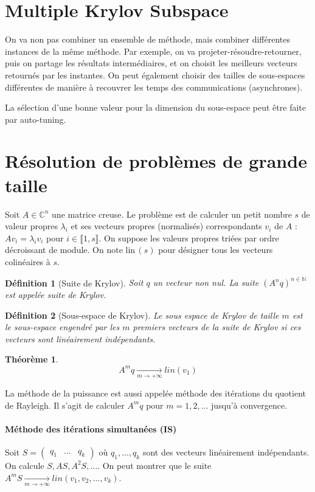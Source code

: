 \documentclass{article}
\newtheorem{thm}{Théorème}
\newtheorem{defi}{Définition}
\newcommand{\lin}{\text{lin}\,}
\begin{document}
\section{Multiple Krylov Subspace}
On va non pas combiner un ensemble de méthode, mais combiner différentes instances de la même méthode. Par exemple, on va projeter-résoudre-retourner, puis on partage les résultats intermédiaires, et on choisit les meilleurs vecteurs retournés par les instantes. On peut également choisir des tailles de sous-espaces différentes de manière à recouvrer les temps des communications (asynchrones).

La sélection d'une bonne valeur pour la dimension du sous-espace peut être faite par auto-tuning.


\section{Résolution de problèmes de grande taille}
Soit $A\in \mathbb{C}^n$ une matrice creuse. Le problème est de calculer un petit nombre $s$ de valeur propres $\lambda_i$ et ses vecteurs propres (normalisés) correspondants $v_i$ de $A$ : $Av_i = \lambda_i v_i$ pour $i\in \llbracket 1,s \rrbracket$. On suppose les valeurs propres triées par ordre décroissant de module. On note $\lin (s)$ pour désigner tous les vecteurs colinéaires à $s$.

\begin{defi}[Suite de Krylov]
Soit $q$ un vecteur non nul. La suite $(A^nq)^{n \in \mathbb{N}}$ est appelée suite de Krylov.
\end{defi}

\begin{defi}[Sous-espace de Krylov]
Le sous espace de Krylov de taille $m$ est le sous-espace engendré par les $m$ premiers vecteurs de la suite de Krylov si ces vecteurs sont linéairement indépendants.
\end{defi}

\begin{thm}
\[ A^m q \underset{m \to + \infty}{\longrightarrow} lin(v_1)\]
\end{thm}

La méthode de la puissance est aussi appelée méthode des itérations du quotient de Rayleigh. Il s'agit de calculer $A^m q$ pour $m = 1, 2, ...$ jusqu'à convergence.


\paragraph{Méthode des itérations simultanées (IS)}
Soit $S= \begin{pmatrix} q_1 & ... &q_k \end{pmatrix}$ où $q_1,..., q_k$ sont des vecteurs linéairement indépendants. On calcule $S, AS, A^2S, ...$. On peut montrer que le suite $A^mS \underset{m\to +\infty}{\longrightarrow} lin(v_1,v_2,...,v_k)$.
\end{document}
